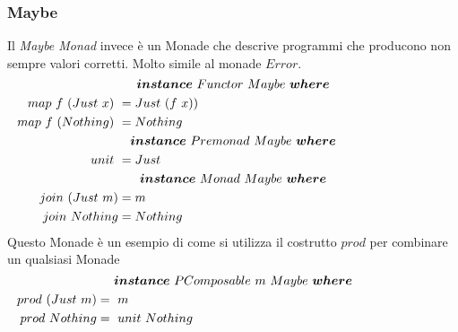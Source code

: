 \subsubsection*{Maybe}
Il \textit{Maybe Monad} invece è un Monade che descrive programmi che producono
non sempre valori corretti.
Molto simile al monade $Error$.
\begin{align*}
  \classdef{\bm{instance}\ Functor\ Maybe\ \bm{where}}
  map\ f\ (Just\ x)\ &= Just\ (f\ x))\\
  map\ f\ (Nothing)\ &= Nothing\\
  \classdef{\bm{instance}\ Premonad\ Maybe\ \bm{where}}
  unit\ &= Just\\
  \classdef{\bm{instance}\ Monad\ Maybe\ \bm{where}}
  join\ (Just\ m) &= m\\
  join\ Nothing &= Nothing\
\end{align*}
Questo Monade è un esempio di come si utilizza il costrutto $prod$ per combinare
un qualsiasi Monade
\begin{align*}
  \classdef{\bm{instance}\ PComposable\ m\ Maybe\ \bm{where}}
  prod\ (Just\ m) &=\ m\\
  prod\ Nothing &=\ unit\ Nothing\\
\end{align*}

\pagebreak